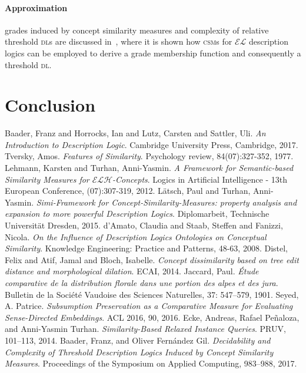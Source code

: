 \documentclass[]{llncs}
\newcommand{\el}{\(\mathcal{EL}{}\)}
\newcommand{\elh}{\(\mathcal{ELH}{}\)}
\newcommand{\dl}{\textsc{dl}}
\newcommand{\csm}{\textsc{csm}}
\begin{document}
  \paragraph{Approximation} grades induced by concept similarity measures and complexity of relative threshold \dl{}s are discussed in~\cite{Ba17}, where it is shown how \csm{}s for \el{} description logics can be employed to derive a grade membership function and consequently a threshold \dl.

  \section{Conclusion}

  \begin{thebibliography}{1}
      Baader, Franz and Horrocks, Ian and Lutz, Carsten and Sattler, Uli.
      \textit{An Introduction to Description Logic}.
      Cambridge University Press, Cambridge, 2017.
      Tversky, Amos.
      \textit{Features of Similarity}.
      Psychology review, 84(07):327-352, 1977.
      Lehmann, Karsten and Turhan, Anni-Yasmin.
      \textit{A Framework for Semantic-based Similarity Measures for \elh-Concepts}.
      Logics in Artificial Intelligence - 13th European Conference, (07):307-319, 2012.
      Lätsch, Paul and Turhan, Anni-Yasmin.
      \textit{Simi-Framework for Concept-Similarity-Measures: property analysis and expansion to more powerful Description Logics}.
      Diplomarbeit, Technische Universität Dresden, 2015.
      d’Amato, Claudia and Staab, Steffen and Fanizzi, Nicola.
      \textit{On the Influence of Description Logics Ontologies on Conceptual Similarity}.
      Knowledge Engineering: Practice and Patterns, 48-63, 2008.
      Distel, Felix and Atif, Jamal and Bloch, Isabelle.
      \textit{Concept dissimilarity based on tree edit  distance and morphological dilation}.
      ECAI, 2014.
      Jaccard, Paul.
      \textit{\'Etude comparative de la distribution florale dans une portion des alpes et des jura}.
      Bulletin de la Société Vaudoise des Sciences Naturelles, 37: 547–579, 1901.
      Seyed, A. Patrice.
      \textit{Subsumption Preservation as a Comparative Measure for Evaluating Sense-Directed Embeddings}.
      ACL 2016, 90, 2016.
    Ecke, Andreas, Rafael Peñaloza, and Anni-Yasmin Turhan.
    \textit{Similarity-Based Relaxed Instance Queries}.
    PRUV, 101–113, 2014.
    Baader, Franz, and Oliver Fernández Gil.
    \textit{Decidability and Complexity of Threshold Description Logics Induced by Concept Similarity Measures}.
    Proceedings of the Symposium on Applied Computing, 983–988, 2017.
  \end{thebibliography}
\end{document}
